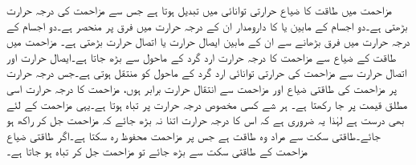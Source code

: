 مزاحمت میں طاقت کا ضیاع حرارتی توانائی میں تبدیل ہوتا ہے جس سے مزاحمت کی درجہ حرارت بڑھتی ہے۔دو اجسام  کے مابین  یا  کا دارومدار ان کے درجہ حرارت میں فرق پر منحصر ہے۔دو اجسام کے درجہ حرارت میں فرق بڑھانے سے ان کے مابین ایصال حرارت یا اتصال حرارت بڑھتی ہے۔  مزاحمت میں طاقت کے ضیاع سے مزاحمت کا درجہ حرارت ارد گرد کے ماحول  سے بڑھ جاتا ہے۔ایصال حرارت اور اتصال حرارت سے مزاحمت کی حرارتی توانائی ارد گرد کے ماحول کو منتقل ہوتی ہے۔جس درجہ حرارت پر مزاحمت کی طاقتی ضیاع اور مزاحمت سے انتقال حرارت برابر ہوں، مزاحمت کا درجہ حرارت اسی مطلق قیمت پر جا رکھتا ہے۔ ہر شے کسی مخصوص درجہ حرارت پر تباہ ہوتا ہے۔یہی مزاحمت کے لئے بھی درست ہے لہٰذا یہ ضروری ہے کہ اس کا درجہ حرارت اتنا نہ بڑھ جائے کہ مزاحمت جل کر راکھ ہو جائے۔طاقتی سکت سے مراد وہ طاقت ہے جس پر مزاحمت محفوظ رہ سکتا ہے۔اگر طاقتی ضیاع مزاحمت کے طاقتی سکت سے بڑھ جائے تو مزاحمت جل کر تباہ ہو جاتا ہے۔

